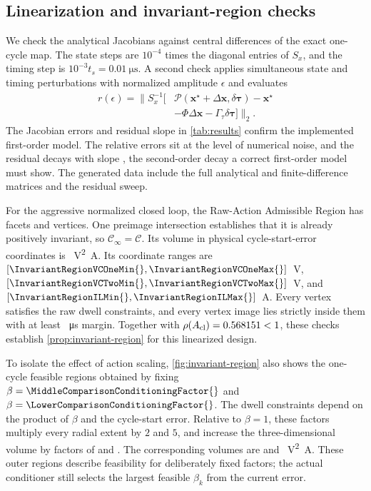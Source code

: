 \documentclass[pdflatex,iicol,sn-mathphys-ay]{sn-jnl}
\newcommand{\vect}[1]{\bm{#1}}
\newcommand{\dtau}{\delta\vect{\tau}}
\begin{document}
\subsection{Linearization and invariant-region checks}

We check the analytical Jacobians against central differences of the exact one-cycle map. The state steps are $10^{-4}$ times the diagonal entries of $S_x$, and the timing step is $10^{-3}t_s=\SI{0.01}{\micro\second}$. A second check applies simultaneous state and timing perturbations with normalized amplitude $\epsilon$ and evaluates
\begin{equation}
\begin{aligned}
    r(\epsilon)=\biggl\|S_x^{-1}\bigl[&\mathcal P(\vect{x}^{\star}+\Delta\vect{x},\dtau)
    -\vect{x}^{\star}\\
    &-\Phi\Delta\vect{x}-\Gamma_\tau\dtau\bigr]\biggr\|_2.
\end{aligned}
\end{equation}
The Jacobian errors and residual slope in \cref{tab:results} confirm the implemented first-order model. The relative errors sit at the level of numerical noise, and the residual decays with slope \LinearizationResidualSlope{}, the second-order decay a correct first-order model must show. The generated data include the full analytical and finite-difference matrices and the residual sweep.

For the aggressive normalized closed loop, the Raw-Action Admissible Region has \InvariantRegionFacets{} facets and \InvariantRegionVertices{} vertices. One preimage intersection establishes that it is already positively invariant, so $\mathcal C_\infty=\mathcal C$. Its volume in physical cycle-start-error coordinates is \InvariantRegionVolume{}~\si{\volt\squared\ampere}. Its coordinate ranges are $[\InvariantRegionVCOneMin{},\InvariantRegionVCOneMax{}]$~V, $[\InvariantRegionVCTwoMin{},\InvariantRegionVCTwoMax{}]$~V, and $[\InvariantRegionILMin{},\InvariantRegionILMax{}]$~A. Every vertex satisfies the raw dwell constraints, and every vertex image lies strictly inside them with at least \InvariantRegionImageDwellMargin{}~\si{\micro\second} margin. Together with $\rho(A_{\mathrm{cl}})=0.568151{}<1$, these checks establish \cref{prop:invariant-region} for this linearized design.

To isolate the effect of action scaling, \cref{fig:invariant-region} also shows the one-cycle feasible regions obtained by fixing $\beta=\MiddleComparisonConditioningFactor{}$ and $\beta=\LowerComparisonConditioningFactor{}$. The dwell constraints depend on the product of $\beta$ and the cycle-start error. Relative to $\beta=1$, these factors multiply every radial extent by $2$ and $5$, and increase the three-dimensional volume by factors of \MiddleComparisonRegionVolumeRatio{} and \LowerComparisonRegionVolumeRatio{}. The corresponding volumes are \MiddleComparisonRegionVolume{} and \LowerComparisonRegionVolume{}~\si{\volt\squared\ampere}. These outer regions describe feasibility for deliberately fixed factors; the actual conditioner still selects the largest feasible $\beta_k$ from the current error.
\end{document}
